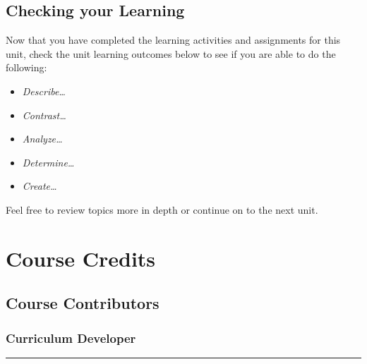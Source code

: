 \documentclass[
]{book}
\providecommand{\tightlist}{%
  \setlength{\itemsep}{0pt}\setlength{\parskip}{0pt}}
\begin{document}
\hypertarget{checking-your-learning-2}{%
\section*{Checking your Learning}\label{checking-your-learning-2}}

\begin{progress}
Now that you have completed the learning activities and assignments for this unit, check the unit learning outcomes below to see if you are able to do the following:

\begin{itemize}
\tightlist
\item
  \emph{Describe\ldots{}}\\
\item
  \emph{Contrast\ldots{}}\\
\item
  \emph{Analyze\ldots{}}\\
\item
  \emph{Determine\ldots{}}\\
\item
  \emph{Create\ldots{}}
\end{itemize}

Feel free to review topics more in depth or continue on to the next unit.
\end{progress}

\hypertarget{course-credits}{%
\chapter*{Course Credits}\label{course-credits}}

\hypertarget{course-contributors}{%
\section*{Course Contributors}\label{course-contributors}}

\hypertarget{curriculum-developer}{%
\subsection*{Curriculum Developer}\label{curriculum-developer}}

\begin{center}\rule{0.5\linewidth}{0.5pt}\end{center}
\end{document}
